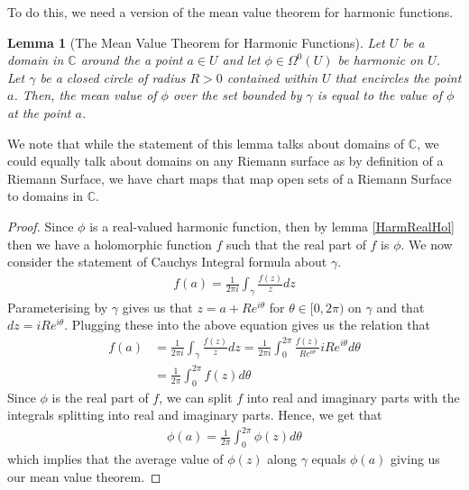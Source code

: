 \documentclass[a4paper,12pt]{report}
\theoremstyle{plain}
\newtheorem{lemma}[thm]{Lemma}
\theoremstyle{definition}
\begin{document}
To do this, we need a version of the mean value theorem for harmonic functions.
\begin{lemma}[The Mean Value Theorem for Harmonic Functions]\label{MVT}
  Let $U$ be a domain in $\mathbb{C}$ around the a point $a \in U$ and let $\phi \in \Omega^0(U)$ be harmonic on $U$. Let $\gamma$ be a closed circle of radius $R > 0$ contained within $U$ that encircles the point $a$. Then, the mean value of $\phi$ over the set bounded by $\gamma$ is equal to the value of $\phi$ at the point $a$. 
\end{lemma}
We note that while the statement of this lemma talks about domains of $\mathbb{C}$, we could equally talk about domains on any Riemann surface as by definition of a Riemann Surface, we have chart maps that map open sets of a Riemann Surface to domains in $\mathbb{C}$. 
\begin{proof}
  Since $\phi$ is a real-valued harmonic function, then by lemma \ref{HarmRealHol} then we have a holomorphic function $f$ such that the real part of $f$ is $\phi$. We now consider the statement of Cauchys Integral formula about $\gamma$.
  \begin{align*}
    f(a) = \frac{1}{2\pi i}\int_{\gamma}\frac{f(z)}{z}dz
  \end{align*}
  Parameterising by $\gamma$ gives us that $z= a + Re^{i\theta}$ for $\theta \in [0, 2\pi)$ on $\gamma$ and that $dz = iRe^{i\theta}$. Plugging these into the above equation gives us the relation that
  \begin{align*}
    f(a) &= \frac{1}{2\pi i}\int_{\gamma}\frac{f(z)}{z}dz = \frac{1}{2\pi i}\int_0^{2\pi}\frac{f(z)}{Re^{i\theta}}iRe^{i\theta}d\theta \\
    &= \frac{1}{2\pi}\int_0^{2\pi}f(z)d\theta
  \end{align*}
  Since $\phi$ is the real part of $f$, we can split $f$ into real and imaginary parts with the integrals splitting into real and imaginary parts. Hence, we get that 
  \begin{align*}
    \phi(a)=\frac{1}{2\pi}\int_0^{2\pi}\phi(z)d\theta
  \end{align*}
    which implies that the average value of $\phi(z)$ along $\gamma$ equals $\phi(a)$ giving us our mean value theorem.
\end{proof}
\end{document}
